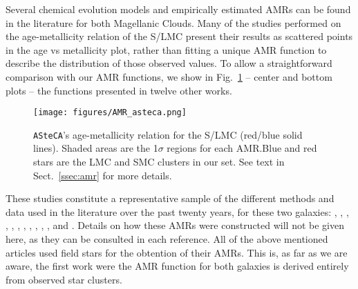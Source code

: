 \documentclass{aa}
\begin{document}
Several chemical evolution models and empirically estimated AMRs can be found in
the literature for both Magellanic Clouds. Many of the studies performed on the
age-metallicity relation of the S/LMC present their results as scattered points
in the age vs metallicity plot, rather than fitting a unique AMR function to
describe the distribution of those observed values.
%
To allow a straightforward comparison with our AMR functions, we show in
Fig.~\ref{fig:amr} -- center and bottom plots -- the functions presented in
twelve other works.
%
\begin{figure}
\centering
\texttt{[image: figures/AMR\_asteca.png]}
\caption{\texttt{ASteCA}'s age-metallicity relation for the S/LMC (red/blue
solid lines). Shaded areas are the 1$\sigma$ regions for each AMR.\@ Blue and
red stars are the LMC and SMC clusters in our set.
See text in Sect.~\ref{ssec:amr} for more details.}
\label{fig:amr}
\end{figure}
%
These studies constitute a representative sample of the different methods and
data used in the literature over the past twenty years, for these two
galaxies:
\citet[][PT98; bursting models]{Pagel_1998}, \citet[][G98; closed-box model
with Holtzman SFH]{Geha_1998}, \citet[][HZ04]{Harris_2004}, \citet[][C08a;
average of four disk frames]{Carrera_2008_lmc}, \citet[][C08b; average of
thirteen frames]{Carrera_2008_smc}, \citet[][HZ09]{Harris_2009}, \citet[][N09;
5th degree polynomial fit to the AMRs of their three observed regions]
{Noel_2009}, \citet[][TB09; 1: no merger model, 2: equal mass merger, 3: one
to four merger]{Tsujimoto_2009}, \citet[][R12; four tiles average]{Rubele_2012},
\citet[][C13; B: Bologna, C: Cole]{Cignoni_2013}, \citet[][PG13]
{Piatti_Geisler_2013}, and \citet[][M14; 0: field LMC0, 1: field LMC1 , 2: field
LMC2]{Meschin_2014}.
Details on how these AMRs were constructed will not be given here, as
they can be consulted in each reference.
%
All of the above mentioned articles used field stars for the obtention
of their AMRs. This is, as far as we are aware, the first work were the AMR
function for both galaxies is derived entirely from observed star clusters.

\end{document}
